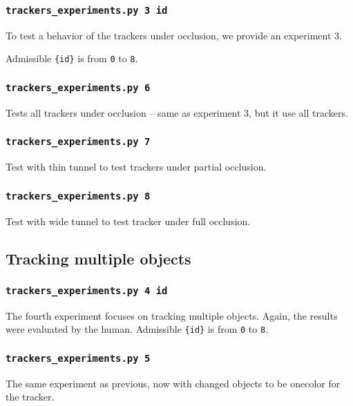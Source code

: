 \subsubsection*{\texttt{trackers{\_}experiments.py 3 {id}}}

To test a behavior of the trackers under occlusion, we provide an experiment 3.

Admissible \verb+{id}+ is from \verb+0+ to \verb+8+.

\subsubsection*{\texttt{trackers{\_}experiments.py 6}}

Tests all trackers under occlusion -- same as experiment 3, but it use all trackers.

\subsubsection*{\texttt{trackers{\_}experiments.py 7}}

Test with thin tunnel to test trackers under partial occlusion.

\subsubsection*{\texttt{trackers{\_}experiments.py 8}}

Test with wide tunnel to test tracker under full occlusion.

\subsection*{Tracking multiple objects}

\subsubsection*{\texttt{trackers{\_}experiments.py 4 {id}}}

The fourth experiment focuses on tracking multiple objects. Again, the results were
evaluated by the human. Admissible \verb+{id}+ is from \verb+0+ to \verb+8+.

\subsubsection*{\texttt{trackers{\_}experiments.py 5}}

The same experiment as previous, now with changed objects to be onecolor for
the \hsv{} tracker.


